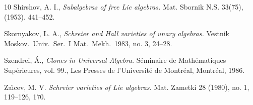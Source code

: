 \documentclass[12pt]{amsart}
\theoremstyle{definition}
\numberwithin{equation}{section}
\begin{document}
\begin{thebibliography}{10}
Shirshov, A. I.,
\emph{Subalgebras of free Lie algebras.}
Mat. Sbornik N.S. 33(75), (1953). 441--452.

Skornyakov, L. A.,
\emph{Schreier and Hall varieties of unary algebras.}
Vestnik Moskov.\ Univ.\ Ser.\ I Mat.\ Mekh.\ 1983, no. 3, 24--28. 

Szendrei, \'{A}.,
{\sl Clones in Universal Algebra.}
S\'{e}minaire de Math\'{e}matiques Sup\'{e}rieures, vol. 99., Les Presses
de l'Universit\'{e} de Montr\'{e}al, Montr\'{e}al, 1986.

Za\u{\i}cev, M. V.
\emph{Schreier varieties of Lie algebras.}
Mat. Zametki 28 (1980), no. 1, 119--126, 170. 
  
\end{thebibliography}
\end{document}
